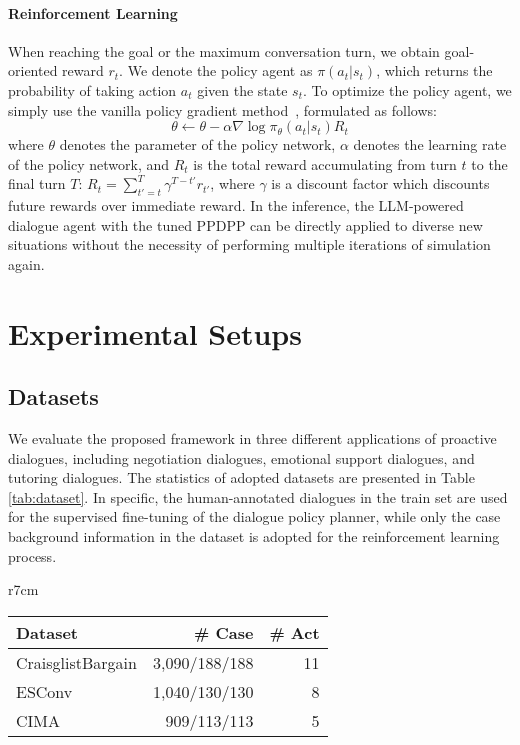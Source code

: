 \documentclass{article} %
\begin{document}
\paragraph{Reinforcement Learning}
When reaching the goal or the maximum conversation turn, we obtain goal-oriented reward $r_t$. 
We denote the policy agent as $\pi(a_t|s_t)$, which returns the probability of taking action $a_t$ given the state $s_t$. To optimize the policy agent, we simply use the vanilla policy gradient method~\citep{nips99-pg}, formulated as follows:
\begin{equation}
    \theta \leftarrow \theta - \alpha \nabla \log \pi_\theta(a_t|s_t)R_t
\end{equation}
where $\theta$ denotes the parameter of the policy network, $\alpha$ denotes the learning rate of the policy network, and $R_t$ is the total reward accumulating from turn $t$ to the final turn $T$: $R_t=\sum^T_{t'=t}\gamma^{T-t'}r_{t'}$, where $\gamma$ is a discount factor which discounts future rewards over immediate reward. 
In the inference, the LLM-powered dialogue agent with the tuned PPDPP can be directly applied to diverse new situations without the necessity of performing multiple iterations of simulation again. 

\section{Experimental Setups}
\subsection{Datasets}

We evaluate the proposed framework in three different applications of proactive dialogues, including negotiation dialogues, emotional support dialogues, and tutoring dialogues. The statistics of adopted datasets are presented in Table \ref{tab:dataset}. In specific, the human-annotated dialogues in the train set are used for the supervised fine-tuning of the dialogue policy planner, while only the case background information in the dataset is adopted for the reinforcement learning process. 

\begin{wraptable}{r}{7cm}
\vspace{-0.7cm}
\caption{The statistics of datasets (train/dev/test).}\label{tab:dataset}
\vspace{-0.3cm}
\begin{tabular}{lrr}\\\toprule  
Dataset &\# Case   & \# Act \\\midrule
CraisglistBargain & 3,090/188/188&11\\  
ESConv &1,040/130/130 & 8\\  
CIMA &909/113/113 & 5\\  \bottomrule
\end{tabular}
\vspace{-0.4cm}
\end{wraptable} 
\end{document}
